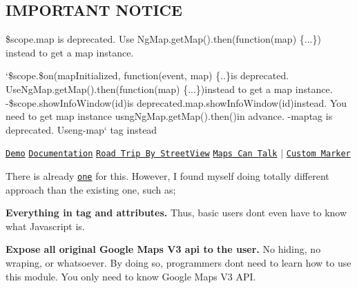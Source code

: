 \href{https://travis-ci.org/allenhwkim/angularjs-google-maps}{\tt }

\subsection*{I\+M\+P\+O\+R\+T\+A\+NT N\+O\+T\+I\+CE }


\begin{DoxyItemize}
\item {\ttfamily \$scope.\+map} is deprecated. Use {\ttfamily Ng\+Map.\+get\+Map().then(function(map) \{...\})} instead to get a map instance.
\item `\$scope.\$on(\textquotesingle{}map\+Initialized\textquotesingle{}, function(event, map) \{..\}{\ttfamily is deprecated. Use}Ng\+Map.\+get\+Map().then(function(map) \{...\}){\ttfamily instead to get a map instance. -\/}\$scope.\+show\+Info\+Window(id){\ttfamily is deprecated.}map.\+show\+Info\+Window(id){\ttfamily instead. You need to get map instance usng}Ng\+Map.\+get\+Map().then(){\ttfamily in advance. -\/}map{\ttfamily tag is deprecated. Use}ng-\/map` tag instead
\end{DoxyItemize}

\href{http://ngmap.github.io}{\tt Demo} \href{https://rawgithub.com/allenhwkim/angularjs-google-maps/master/build/docs/index.html}{\tt Documentation} \href{https://rawgit.com/allenhwkim/angularjs-google-maps/master/testapp/street-view_road_trip.html}{\tt Road Trip By Street\+View} \href{https://rawgit.com/allenhwkim/angularjs-google-maps/master/testapp/custom-marker.html}{\tt Maps Can Talk} $\vert$ \href{https://rawgit.com/allenhwkim/angularjs-google-maps/master/testapp/custom-marker-2.html}{\tt Custom Marker}

There is already \href{https://github.com/nlaplante/angular-google-maps}{\tt one} for this. However, I found myself doing totally different approach than the existing one, such as;


\begin{DoxyEnumerate}
\item {\bfseries Everything in tag and attributes.} Thus, basic users don\textquotesingle{}t even have to know what Javascript is.
\item {\bfseries Expose all original Google Maps V3 api to the user.} No hiding, no wraping, or whatsoever. By doing so, programmers don\textquotesingle{}t need to learn how to use this module. You only need to know Google Maps V3 A\+PI.
\end{DoxyEnumerate}

